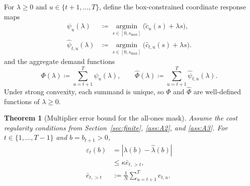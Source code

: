 \documentclass{uai2026} %
\newtheorem{theorem}{Theorem}[section]
\newcommand{\1}{\mathbf{1}}
\renewcommand{\epsilon}{\varepsilon}
\newcommand{\eqdef}{\coloneqq}
\newcommand{\argmin}{\operatorname*{argmin}}
\begin{document}
For $\lambda \ge 0$ and $u \in \{t+1,\dots,T\}$, define the box-constrained coordinate response maps
\begin{equation*}
  \begin{aligned}
    \psi_u(\lambda)
    &\eqdef \argmin_{s \in [0,s_{\max}]} \bigl(\tilde{c}_u(s)+\lambda s\bigr),\\
    \hat{\psi}_{t,u}(\lambda)
    &\eqdef \argmin_{s \in [0,s_{\max}]} \bigl(\hat{c}_{t,u}(s)+\lambda s\bigr).
  \end{aligned}
\end{equation*}
and the aggregate demand functions
\begin{equation*}
  \Phi(\lambda)
  \eqdef \sum_{u=t+1}^{T} \psi_u(\lambda),
  \qquad
  \hat{\Phi}(\lambda)
  \eqdef \sum_{u=t+1}^{T} \hat{\psi}_{t,u}(\lambda).
\end{equation*}
Under strong convexity, each summand is unique, so $\Phi$ and $\hat{\Phi}$
are well-defined functions of $\lambda \ge 0$.

\begin{theorem}[Multiplier error bound for the all-ones mask]
  \label{thm:epsilon-allones-app}%
  Assume the cost regularity conditions from Section~\ref{sec:finite}, \ref{ass:A2}, and \ref{ass:A3}.
  For $t \in \{1,\dots,T-1\}$ and $b = b_{t+1} > 0$,
  \begin{equation}
    \label{eq:epsilon-allones-app}
    \begin{aligned}
      \epsilon_t(b)
      &= |\lambda(b)-\hat{\lambda}(b)|\\
      &\le \kappa\bar{e}_{t,>t},\\
      \bar{e}_{t,>t}
      &:= \frac{1}{N}\sum_{u=t+1}^{T} e_{t,u}.
    \end{aligned}
  \end{equation}
\end{theorem}
\end{document}
